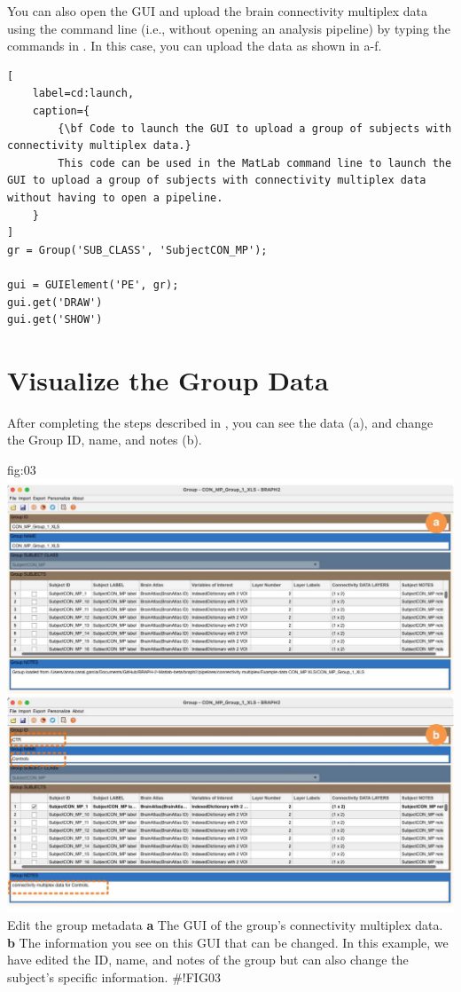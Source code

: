 \documentclass[justified]{tufte-handout}
\begin{document}
\begin{tcolorbox}[
	title=GUI launch from command line
]
You can also open the GUI and upload the brain connectivity multiplex data using the command line (i.e., without opening an analysis pipeline) by typing the commands in . In this case, you can upload the data as shown in a-f.
%
\begin{lstlisting}[
	label=cd:launch,
	caption={
		{\bf Code to launch the GUI to upload a group of subjects with connectivity multiplex data.}
		This code can be used in the MatLab command line to launch the GUI to upload a group of subjects with connectivity multiplex data without having to open a pipeline.
	}
]
gr = Group('SUB_CLASS', 'SubjectCON_MP');

gui = GUIElement('PE', gr);
gui.get('DRAW')
gui.get('SHOW')
\end{lstlisting}
\end{tcolorbox}

\section{Visualize the Group Data}

After completing the steps described in , you can see the data (a), and change the Group ID, name, and notes (b). 

	{fig:03}
	{
	\includegraphics{fig03.jpg}
	}
	{Edit the group metadata}
	{ 
	{\bf a} The GUI of the group's connectivity multiplex data. 
	{\bf b} The information you see on this GUI that can be changed. In this example, we have edited the ID, name, and notes of the group but can also change the subject's specific information.
	}
#!FIG03
\end{document}
